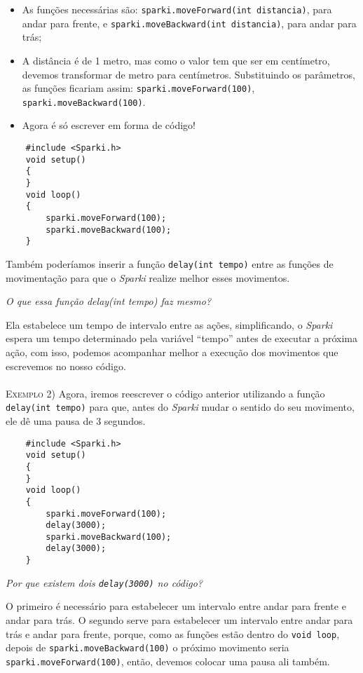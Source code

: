     \begin{itemize}
        \item As funções necessárias são: \texttt{sparki.moveForward(int distancia)}, para andar para frente, e \texttt{sparki.moveBackward(int distancia)}, para andar para trás;
        \item A distância é de 1 metro, mas como o valor tem que ser em centímetro, devemos transformar de metro para centímetros. Substituindo os parâmetros, as funções ficariam assim: \texttt{sparki.moveForward(100)}, \texttt{sparki.moveBackward(100)}.
        \item Agora é só escrever em forma de código!
    \end{itemize}
    
    \begin{verbatim}
    #include <Sparki.h>
    void setup()
    {
    }
    void loop()
    {
        sparki.moveForward(100);
        sparki.moveBackward(100);
    }
    \end{verbatim}
    
    Também poderíamos inserir a função \texttt{delay(int tempo)} entre as funções de movimentação para que o \textsl{Sparki} realize melhor esses movimentos.
    
    \textit{O que essa função delay(int tempo) faz mesmo?} 
    
    Ela estabelece um tempo de intervalo entre as ações, simplificando, o \textsl{Sparki} espera um tempo determinado pela variável ``tempo'' antes de executar a próxima ação, com isso, podemos acompanhar melhor a execução dos movimentos que escrevemos no nosso código.
    \\
    \\
    \textsc{Exemplo 2)} Agora, iremos reescrever o código anterior utilizando a função \texttt{delay(int tempo)} para que, antes do \textsl{Sparki} mudar o sentido do seu movimento, ele dê uma pausa de 3 segundos.
    
    \begin{verbatim}
    #include <Sparki.h>
    void setup()
    {
    }
    void loop()
    {
        sparki.moveForward(100);
        delay(3000);
        sparki.moveBackward(100);
        delay(3000);
    }
    \end{verbatim}
    
    \textit{Por que existem dois \texttt{delay(3000)} no código?}
    
    O primeiro é necessário para estabelecer um intervalo entre andar para frente e andar para trás. O segundo serve para estabelecer um intervalo entre andar para trás e andar para frente, porque, como as funções estão dentro do \texttt{void loop}, depois de \texttt{sparki.moveBackward(100)} o próximo movimento seria \texttt{sparki.moveForward(100)}, então, devemos colocar uma pausa ali também.  
    
